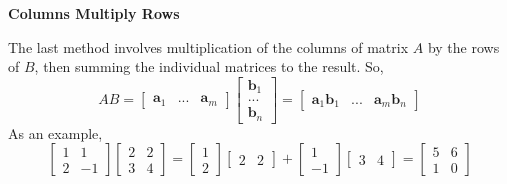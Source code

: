            \par \hfill \break
            \textbf{Columns Multiply Rows}
            \par \hfill \break
            The last method involves multiplication of the columns of matrix \(A\) by the rows of \(B\), then summing
            the individual matrices to the result. So,
            \begin{equation}
                AB =
                \begin{bmatrix}
                    \boldsymbol{a}_1 & ... & \boldsymbol{a}_m
                \end{bmatrix}
                \begin{bmatrix}
                    \boldsymbol{b}_1 \\
                    ... \\
                    \boldsymbol{b}_n
                \end{bmatrix}
                =
                \begin{bmatrix}
                    \boldsymbol{a}_1 \boldsymbol{b}_1 & ... & \boldsymbol{a}_m \boldsymbol{b}_n
                \end{bmatrix}
            \end{equation}
            As an example,
            \begin{equation}
                \begin{bmatrix}
                    1 & 1 \\
                    2 & -1
                \end{bmatrix}
                \begin{bmatrix}
                    2 & 2 \\
                    3 & 4
                \end{bmatrix}
                =
                \begin{bmatrix}
                    1 \\
                    2
                \end{bmatrix}
                \begin{bmatrix}
                    2 & 2
                \end{bmatrix}
                +
                \begin{bmatrix}
                    1 \\
                    -1
                \end{bmatrix}
                \begin{bmatrix}
                    3 & 4
                \end{bmatrix}
                =
                \begin{bmatrix}
                    5 & 6 \\
                    1 & 0
                \end{bmatrix}
            \end{equation}
        
